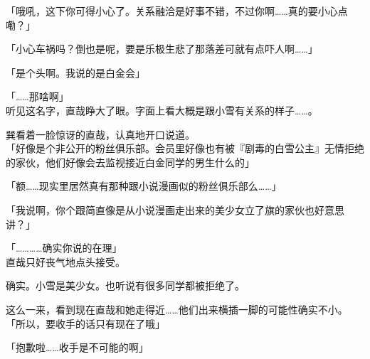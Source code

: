 「哦吼，这下你可得小心了。关系融洽是好事不错，不过你啊……真的要小心点嘞？」

「小心车祸吗？倒也是呢，要是乐极生悲了那落差可就有点吓人啊……」

「是个头啊。我说的是白金会」

「……那啥啊」\\

听见这名字，直哉睁大了眼。字面上看大概是跟小雪有关系的样子……。

巽看着一脸惊讶的直哉，认真地开口说道。\\

「好像是个非公开的粉丝俱乐部。会员里好像也有被『剧毒的白雪公主』无情拒绝的家伙，他们好像会去监视接近白金同学的男生什么的」

「额……现实里居然真有那种跟小说漫画似的粉丝俱乐部么……」

「我说啊，你个跟简直像是从小说漫画走出来的美少女立了旗的家伙也好意思讲？」

「…………确实你说的在理」\\

直哉只好丧气地点头接受。

确实。小雪是美少女。也听说有很多同学都被拒绝了。

这么一来，看到现在直哉和她走得近……他们出来横插一脚的可能性确实不小。\\

「所以，要收手的话只有现在了哦」

「抱歉啦……收手是不可能的啊」\\

